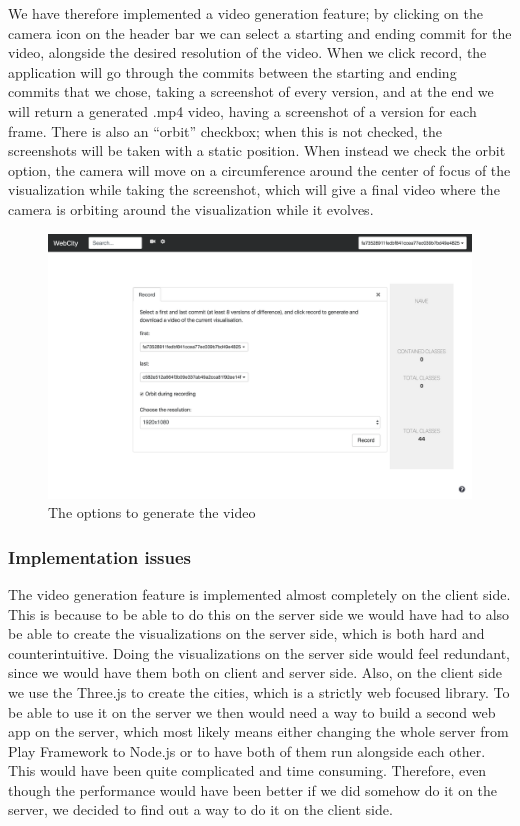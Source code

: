 \documentclass[]{usiinfbachelorproject}
\begin{document}
We have therefore implemented a video generation feature; by clicking on the camera icon on the header bar we can select a starting and ending commit for the video, alongside the desired resolution of the video. When we click record, the application will go through the commits between the starting and ending commits that we chose, taking a screenshot of every version, and at the end we will return a generated .mp4 video, having a screenshot of a version for each frame.
There is also an ``orbit'' checkbox; when this is not checked, the screenshots will be taken with a static position. When instead we check the orbit option, the camera will move on a circumference around the center of focus of the visualization while taking the screenshot, which will give a final video where the camera is orbiting around the visualization while it evolves.

\begin{figure} [H]
\centering
\includegraphics[width=1\textwidth]{pictures/record_card.png}
\caption{The options to generate the video}
\label{fig:record}
\end{figure}

\subsubsection{Implementation issues} \label{Implementation issues}

The video generation feature is implemented almost completely on the client side. This is because to be able to do this on the server side we would have had to also be able to create the visualizations on the server side, which is both hard and counterintuitive. Doing the visualizations on the server side would feel redundant, since we would have them both on client and server side.
Also, on the client side we use the Three.js to create the cities, which is a strictly web focused library. To be able to use it on the server we then would need a way to build a second web app on the server, which most likely means either changing the whole server from Play Framework to Node.js or to have both of them run alongside each other. This would have been quite complicated and time consuming.
Therefore, even though the performance would have been better if we did somehow do it on the server, we decided to find out a way to do it on the client side.
\end{document}
